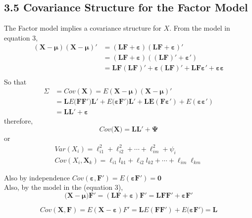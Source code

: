 \documentclass[12pt]{article}
\numberwithin{equation}{section}
\begin{document}
\subsection*{3.5 Covariance Structure for the  Factor Model}
\noindent The Factor model implies a covariance structure for $X$. From the 
model in equation 3, 
\begin{equation}
	\begin{aligned}
		(\mathbf{X}-\boldsymbol{\mu})(\mathbf{X}-\boldsymbol{\mu})' &= (\mathbf{LF}+\boldsymbol{\varepsilon})(\mathbf{LF}+ \boldsymbol{\varepsilon})' \\
		&= (\mathbf{LF}+\boldsymbol{\varepsilon})((\mathbf{LF})'+\boldsymbol{\varepsilon}') \\
		&= \mathbf{LF(LF)'} + \mathbf{\varepsilon(LF)' + LF \boldsymbol{\varepsilon}' + \boldsymbol{\varepsilon}\boldsymbol{\varepsilon} }\\
	\end{aligned}
\end{equation}
So that
\begin{equation}
	\begin{aligned}
		\Sigma & = Cov(\mathbf{X}) = E(\mathbf{X}- \boldsymbol{\mu})(\mathbf{X}- \boldsymbol{\mu})' \\
		&=\mathbf{L}E(\mathbf{FF')L'}+ E(\mathbf{\boldsymbol{\varepsilon} F')L' + LE(F \boldsymbol{\varepsilon}')}+E(\boldsymbol{\varepsilon}\boldsymbol{\varepsilon}')\\
		&= \mathbf{LL'}+ \boldsymbol{\varepsilon}
	\end{aligned}
\end{equation}
\noindent therefore,
$$Cov(\mathbf{X)=LL'} +\boldsymbol{\Psi}$$ 
or
\begin{equation}
	\begin{aligned}
		Var(X_i)= \ell_{i1}^2 + \ell_{i2}^2 + \cdots +\ell_{im}^2 + \psi_i \\
		Cov(X_i,\mathbf{X}_k) = \ell_{i1}l_{k1} + \ell_{i2}l_{k2} + \cdots +\ell_{im}\ell_{km}
	\end{aligned}
\end{equation}


\noindent Also by independence $Cov(\boldsymbol{\varepsilon, F'})=E(\boldsymbol{\varepsilon}\mathbf{F'}) =\mathbf{0}$ \\
Also, by the model in the (equation 3),
$$(\mathbf{X - \boldsymbol{\mu})F'= (LF +\boldsymbol{\varepsilon})F'=LFF' +\boldsymbol{\varepsilon} F'}$$

$$Cov(\mathbf{X,F})= E(\mathbf{X}-\boldsymbol{\varepsilon})F'= \mathbf{L}E(\mathbf{FF'}) + E(\mathbf{\boldsymbol{\varepsilon} F')= L}$$
\end{document}
